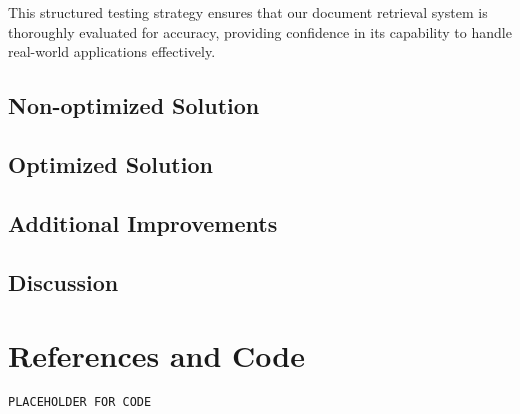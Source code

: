 \documentclass[12pt,a4paper]{article}
\begin{document}
\noindent This structured testing strategy ensures that our document retrieval system is thoroughly evaluated for accuracy, providing confidence in its capability to handle real-world applications effectively.


\subsection{Non-optimized Solution}



\subsection{Optimized Solution}

\subsection{Additional Improvements}

\newpage
\subsection{Discussion}

\newpage
\section{References and Code}

\begin{lstlisting}[style=Matlab-Pyglike]
PLACEHOLDER FOR CODE
\end{lstlisting}
\end{document}
